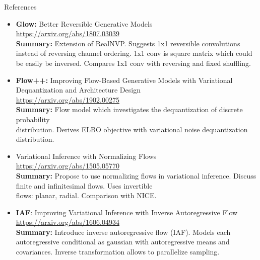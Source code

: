 \documentclass{beamer}
\begin{document}
\begin{frame}{References}
	{\scriptsize
		\begin{itemize}
			
			\item \textbf{Glow:} Better Reversible Generative Models \\
			\href{https://arxiv.org/abs/1807.03039}{https://arxiv.org/abs/1807.03039} \\
			\textbf{Summary:} Extension of RealNVP. Suggests 1x1 reversible convolutions instead of reversing channel ordering. 1x1 conv is square matrix which could be easily be inversed. Compares 1x1 conv with reversing and fixed shuffling. 
			
			\item \textbf{Flow++:} Improving Flow-Based Generative Models with Variational Dequantization and Architecture Design \\
			\href{https://arxiv.org/abs/1902.00275}{https://arxiv.org/abs/1902.00275} \\
			\textbf{Summary:} Flow model which investigates the dequantization of discrete probability \\ distribution. Derives ELBO objective with variational noise dequantization distribution.
			
			\item Variational Inference with Normalizing Flows \\
			\href{https://arxiv.org/abs/1505.05770}{https://arxiv.org/abs/1505.05770} \\
			\textbf{Summary:} Propose to use normalizing flows in variational inference. Discuss finite and infinitesimal flows. Uses invertible \\
			flows: planar, radial. Comparison with NICE.
			
			\item \textbf{IAF}: Improving Variational Inference with Inverse Autoregressive Flow \\
			\href{https://arxiv.org/abs/1606.04934}{https://arxiv.org/abs/1606.04934} \\
			\textbf{Summary:} Introduce inverse autoregressive flow (IAF). Models each autoregressive conditional as gaussian with autoregressive means and covariances. Inverse transformation allows to parallelize sampling.
			
		\end{itemize}
	}
\end{frame}
\end{document}
